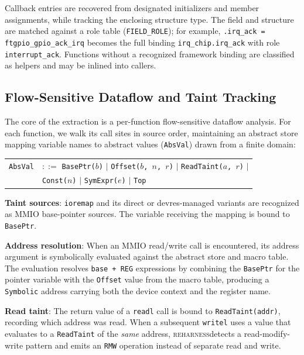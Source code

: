 \documentclass[sigplan, screen, review, anonymous]{acmart}
\newcommand{\reharness}{\textsc{reharness}}
\begin{document}
Callback entries are recovered from designated initializers and member assignments, while tracking the enclosing structure type. The field and structure are matched against a role table (\texttt{FIELD\_ROLE}); for example, \texttt{.irq\_ack = ftgpio\_gpio\_ack\_irq} becomes the full binding \texttt{irq\_chip.irq\_ack} with role \texttt{interrupt\_ack}. Functions without a recognized framework binding are classified as helpers and may be inlined into callers.

\subsection{Flow-Sensitive Dataflow and Taint Tracking}

The core of the extraction is a per-function flow-sensitive dataflow analysis. For each function, we walk its call sites in source order, maintaining an abstract store mapping variable names to abstract values (\texttt{AbsVal}) drawn from a finite domain:

\begin{center}
\begin{tabular}{ll}
\texttt{AbsVal} & $::=$ \texttt{BasePtr($b$)} $|$ \texttt{Offset($b$, $n$, $r$)} $|$
\texttt{ReadTaint($a$, $r$)} $|$ \\
& \quad\;\; \texttt{Const($n$)} $|$ \texttt{SymExpr($e$)} $|$ \texttt{Top} \\
\end{tabular}
\end{center}

\textbf{Taint sources}: \texttt{ioremap} and its direct or devres-managed variants are recognized as MMIO base-pointer sources. The variable receiving the mapping is bound to \texttt{BasePtr}.

\textbf{Address resolution}: When an MMIO read/write call is encountered, its address argument is symbolically evaluated against the abstract store and macro table. The evaluation resolves \texttt{base + REG} expressions by combining the \texttt{BasePtr} for the pointer variable with the \texttt{Offset} value from the macro table, producing a \texttt{Symbolic} address carrying both the device context and the register name.

\textbf{Read taint}: The return value of a \texttt{readl} call is bound to \texttt{ReadTaint(addr)}, recording which address was read. When a subsequent \texttt{writel} uses a value that evaluates to a \texttt{ReadTaint} of the \textit{same} address, \reharness detects a read-modify-write pattern and emits an \texttt{RMW} operation instead of separate read and write.
\end{document}
